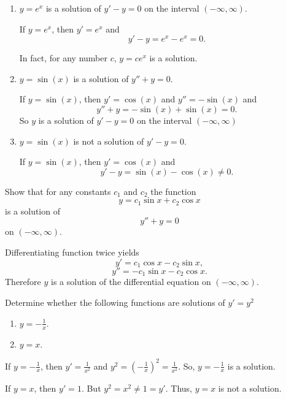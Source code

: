 \begin{example}
  \begin{enumerate}
    \item $y = e^x$ is a solution of $y' - y  = 0$ on the interval $(-\infty, \infty)$.

          If $y = e^x$, then $y'=e^x$ and
          $$y' - y = e^x -e^x = 0.$$

          In fact, for any number $c$, $y= ce^x$ is a solution.

    \item $y = \sin (x)$ is a solution of $y'' + y =0$.

          If $y= \sin (x)$, then $y' = \cos(x)$ and $y'' = - \sin(x)$ and
          $$y'' + y =  - \sin(x)+   \sin(x)= 0.$$
          So $y$ is a solution of $y'- y  = 0$ on the interval $(-\infty, \infty)$

    \item $y= \sin (x)$  is not a solution of $y'  - y =0$.

          If $y= \sin (x)$, then $y' = \cos(x)$ and
          $$y' - y = \sin(x) - \cos(x) \ne 0.$$
  \end{enumerate}
\end{example}

\begin{example}
  Show that for any constants $c_1$ and $c_2$ the function
  $$y=c_1\sin x + c_2\cos x$$
  is a solution of
  $$y'' + y = 0$$
  on $(-\infty,\infty)$.
\end{example}
\begin{solution}

  Differentiating function twice yields
  $$y'=c_1\cos x - c_2\sin x,$$
  $$y''=-c_1\sin x - c_2\cos x.$$
  Therefore $y$ is a solution of the differential equation on $(-\infty,\infty)$.
\end{solution}

\begin{exercise}
  Determine whether the following functions are solutions of $y' =  y^2$
  \begin{enumerate}
    \item $y = -\frac{1}{x}$.
    \item $y = x$.
  \end{enumerate}
\end{exercise}
\begin{exersol}
  If $y = -\frac{1}{x}$, then $y' = \frac{1}{x^2}$ and
  $y^2 = \left(-\frac1x\right)^2=\frac{1}{x^2}$.
  So, $y = -\frac{1}{x}$ is a solution.

  If $y = x$, then $y' = 1$. But $y^2 = x^2\ne 1=y'$.
  Thus, $y = x$ is not a solution.
\end{exersol}

